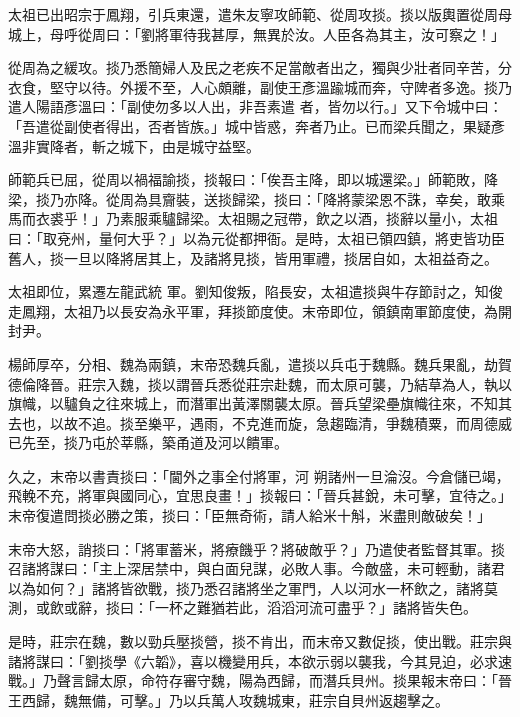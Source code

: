 \begin{pinyinscope}
 太祖已出昭宗于鳳翔，引兵東還，遣朱友寧攻師範、從周攻掞。掞以版輿置從周母城上，母呼從周曰：「劉將軍待我甚厚，無異於汝。人臣各為其主，汝可察之！」



 從周為之緩攻。掞乃悉簡婦人及民之老疾不足當敵者出之，獨與少壯者同辛苦，分衣食，堅守以待。外援不至，人心頗離，副使王彥溫踰城而奔，守陴者多逸。掞乃遣人陽語彥溫曰：「副使勿多以人出，非吾素遣
 者，皆勿以行。」又下令城中曰：「吾遣從副使者得出，否者皆族。」城中皆惑，奔者乃止。已而梁兵聞之，果疑彥溫非實降者，斬之城下，由是城守益堅。



 師範兵已屈，從周以禍福諭掞，掞報曰：「俟吾主降，即以城還梁。」師範敗，降梁，掞乃亦降。從周為具齎裝，送掞歸梁，掞曰：「降將蒙梁恩不誅，幸矣，敢乘馬而衣裘乎！」乃素服乘驢歸梁。太祖賜之冠帶，飲之以酒，掞辭以量小，太祖曰：「取兗州，量何大乎？」以為元從都押衙。是時，太祖已領四鎮，將吏皆功臣舊人，掞一旦以降將居其上，及諸將見掞，皆用軍禮，掞居自如，太祖益奇之。



 太祖即位，累遷左龍武統
 軍。劉知俊叛，陷長安，太祖遣掞與牛存節討之，知俊走鳳翔，太祖乃以長安為永平軍，拜掞節度使。末帝即位，領鎮南軍節度使，為開封尹。



 楊師厚卒，分相、魏為兩鎮，末帝恐魏兵亂，遣掞以兵屯于魏縣。魏兵果亂，劫賀德倫降晉。莊宗入魏，掞以謂晉兵悉從莊宗赴魏，而太原可襲，乃結草為人，執以旗幟，以驢負之往來城上，而潛軍出黃澤關襲太原。晉兵望梁壘旗幟往來，不知其去也，以故不追。掞至樂平，遇雨，不克進而旋，急趨臨清，爭魏積粟，而周德威已先至，掞乃屯於莘縣，築甬道及河以饋軍。



 久之，末帝以書責掞曰：「閫外之事全付將軍，河
 朔諸州一旦淪沒。今倉儲已竭，飛輓不充，將軍與國同心，宜思良畫！」掞報曰：「晉兵甚銳，未可擊，宜待之。」末帝復遣問掞必勝之策，掞曰：「臣無奇術，請人給米十斛，米盡則敵破矣！」



 末帝大怒，誚掞曰：「將軍蓄米，將療饑乎？將破敵乎？」乃遣使者監督其軍。掞召諸將謀曰：「主上深居禁中，與白面兒謀，必敗人事。今敵盛，未可輕動，諸君以為如何？」諸將皆欲戰，掞乃悉召諸將坐之軍門，人以河水一杯飲之，諸將莫測，或飲或辭，掞曰：「一杯之難猶若此，滔滔河流可盡乎？」諸將皆失色。



 是時，莊宗在魏，數以勁兵壓掞營，掞不肯出，而末帝又數促掞，使出戰。莊宗與
 諸將謀曰：「劉掞學《六韜》，喜以機變用兵，本欲示弱以襲我，今其見迫，必求速戰。」乃聲言歸太原，命符存審守魏，陽為西歸，而潛兵貝州。掞果報末帝曰：「晉王西歸，魏無備，可擊。」乃以兵萬人攻魏城東，莊宗自貝州返趨擊之。




\end{pinyinscope}
